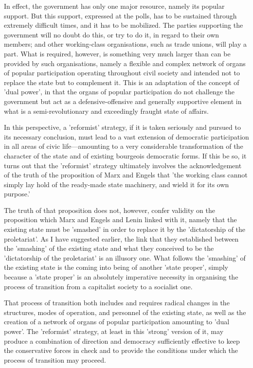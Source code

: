 In effect, the government has only one major resource, namely its popular support. But this support, expressed at the polls, has to be sustained through extremely difficult times, and it has to be mobilized. The parties supporting the government will no doubt do this, or try to do it, in regard to their own members; and other working-class organisations, such as trade unions, will play a part. What is required, however, is something very much larger than can be provided by such organisations, namely a flexible and complex network of organs of popular participation operating throughout civil society and intended not to replace the state but to complement it. This is an adaptation of the concept of 'dual power', in that the organs of popular participation do not challenge the government but act as a defensive-offensive and generally supportive element in what is a semi-revolutionary and exceedingly fraught state of affairs.

In this perspective, a 'reformist' strategy, if it is taken seriously and pursued to its necessary conclusion, must lead to a vast extension of democratic participation in all areas of civic life—amounting to a very considerable transformation of the character of the state and of existing bourgeois democratic forms. If this be so, it turns out that the 'reformist' strategy ultimately involves the acknowledgement of the truth of the proposition of Marx and Engels that 'the working class cannot simply lay hold of the ready\hyp{}made state machinery, and wield it for its own purpose.'

The truth of that proposition does not, however, confer validity on the proposition which Marx and Engels and Lenin linked with it, namely that the existing state must be 'smashed' in order to replace it by the 'dictatorship of the proletariat'. As I have suggested earlier, the link that they established between the 'smashing' of the existing state and what they conceived to be the 'dictatorship of the proletariat' is an illusory one. What follows the 'smashing' of the existing state is the coming into being of another 'state proper', simply because a 'state proper' is an absolutely imperative necessity in organising the process of transition from a capitalist society to a socialist one.

That process of transition both includes and requires radical changes in the structures, modes of operation, and personnel of the existing state, as well as the creation of a network of organs of popular participation amounting to 'dual power'. The 'reformist' strategy, at least in this 'strong' version of it, may produce a combination of direction and democracy sufficiently effective to keep the conservative forces in check and to provide the conditions under which the process of transition may proceed.

